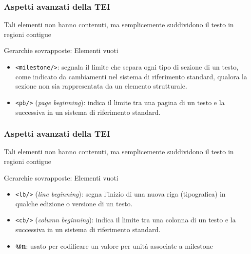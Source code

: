     \begin{frame}
        \frametitle{Aspetti avanzati della TEI}
        \addtocounter{nframe}{1}
        
        Tali elementi non hanno contenuti, ma semplicemente suddividono il testo in regioni contigue
        \begin{block}{Gerarchie sovrapposte: Elementi vuoti}
            \begin{itemize}
                \item \texttt{<milestone/>}: segnala il limite che separa ogni tipo di sezione di un testo, come indicato da cambiamenti nel sistema di riferimento standard, qualora la sezione non sia rappresentata da un elemento strutturale.
                \item \texttt{<pb/>} (\textit{page beginning}): indica il limite tra una pagina di un testo e la successiva in un sistema di riferimento standard.
            \end{itemize}
        \end{block}

    \end{frame}

    \begin{frame}
        \frametitle{Aspetti avanzati della TEI}
        \addtocounter{nframe}{1}
        
        Tali elementi non hanno contenuti, ma semplicemente suddividono il testo in regioni contigue
        \begin{block}{Gerarchie sovrapposte: Elementi vuoti}
            \begin{itemize}
                \item \texttt{<lb/>} (\textit{line beginning}): segna l'inizio di una nuova riga (tipografica) in qualche edizione o versione di un testo.
                \item \texttt{<cb/>} (\textit{column beginning}): indica il limite tra una colonna di un testo e la successiva in un sistema di riferimento standard.
                \item \textbf{@n}: usato per codificare un valore per unità associate a milestone
            \end{itemize}
        \end{block}

    \end{frame}


